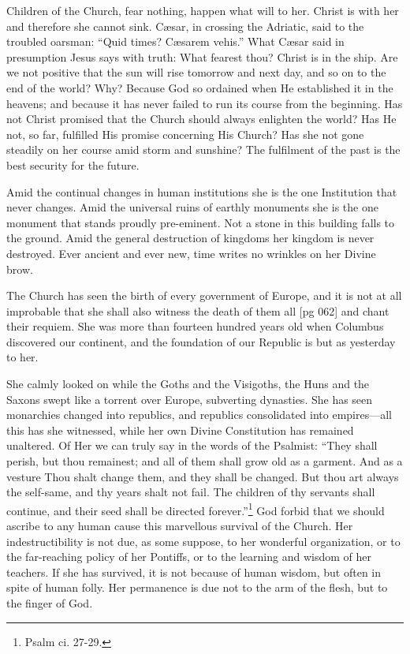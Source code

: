 Children of the Church, fear nothing, happen
what will to her. Christ is with her and therefore
she cannot sink. Cæsar, in crossing the Adriatic,
said to the troubled oarsman: “Quid times?
Cæsarem vehis.” What Cæsar said in presumption
Jesus says with truth: What fearest thou?
Christ is in the ship. Are we not positive that
the sun will rise tomorrow and next day, and so
on to the end of the world? Why? Because God
so ordained when He established it in the heavens;
and because it has never failed to run its
course from the beginning. Has not Christ promised
that the Church should always enlighten the
world? Has He not, so far, fulfilled His promise
concerning His Church? Has she not gone steadily
on her course amid storm and sunshine? The
fulfilment of the past is the best security for the
future.

Amid the continual changes in human institutions
she is the one Institution that never changes.
Amid the universal ruins of earthly monuments
she is the one monument that stands proudly pre-eminent.
Not a stone in this building falls to the
ground. Amid the general destruction of kingdoms
her kingdom is never destroyed. Ever ancient
and ever new, time writes no wrinkles on
her Divine brow.

The Church has seen the birth of every government
of Europe, and it is not at all improbable
that she shall also witness the death of them all
[pg 062]
and chant their requiem. She was more than fourteen
hundred years old when Columbus discovered
our continent, and the foundation of our Republic
is but as yesterday to her.

She calmly looked on while the Goths and the
Visigoths, the Huns and the Saxons swept like a
torrent over Europe, subverting dynasties. She
has seen monarchies changed into republics, and
republics consolidated into empires—all this has
she witnessed, while her own Divine Constitution
has remained unaltered. Of Her we can truly
say in the words of the Psalmist: “They shall
perish, but thou remainest; and all of them shall
grow old as a garment. And as a vesture Thou
shalt change them, and they shall be changed. But
thou art always the self-same, and thy years shalt
not fail. The children of thy servants shall continue,
and their seed shall be directed forever.”\footnote{Psalm ci. 27-29.}
God forbid that we should ascribe to any human
cause this marvellous survival of the Church.
Her indestructibility is not due, as some suppose,
to her wonderful organization, or to the far-reaching
policy of her Pontiffs, or to the learning and
wisdom of her teachers. If she has survived, it
is not because of human wisdom, but often in
spite of human folly. Her permanence is due not
to the arm of the flesh, but to the finger of God.

